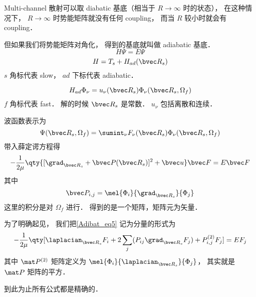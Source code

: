 
Multi-channel 散射可以取 diabatic 基底（相当于 $R\to \infty$ 时的状态）， 在这种情况下， $R\to\infty$ 时势能矩阵就没有任何 coupling， 而当 $R$ 较小时就会有 coupling．

但如果我们将势能矩阵对角化， 得到的基底就叫做 adiabatic 基底．
\begin{equation}
H \Psi = E \Psi
\end{equation}
\begin{equation}
H = T_s + H_{ad}(\bvec R_s)
\end{equation}
$s$ 角标代表 slow， $ad$ 下标代表 adiabatic．

\begin{equation}
H_{ad} \Phi_\nu = u_\nu (\bvec R_s) \Phi_\nu (\bvec R_s, \Omega_f)
\end{equation}
$f$ 角标代表 fast． 解的时候 $\bvec R_s$ 是常数． $u_\nu$ 包括离散和连续．

波函数表示为
\begin{equation}
\Psi(\bvec R_s, \Omega_f) = \sumint_\nu F_\nu (\bvec R_s) \Phi_\nu(\bvec R_s, \Omega_f)
\end{equation}
带入薛定谔方程得
\begin{equation}\label{Adibat_eq5}
-\frac{1}{2\mu} \qty{[\grad_{\bvec R_s} + \bvec P(\bvec R_s)]^2 + \bvec u} \bvec F = E \bvec F
\end{equation}
其中
\begin{equation}
\bvec P_{i,j} = \mel{\Phi_i}{\grad_{\bvec R_s}}{\Phi_j}
\end{equation}
这里的积分是对 $\Omega_f$ 进行． 得到的是一个矩阵，矩阵元为矢量．

为了明确起见， 我们把\autoref{Adibat_eq5} 记为分量的形式为
\begin{equation}
-\frac{1}{2\mu} \qty[\laplacian_{\bvec R_s} F_i + 2\sum_j ( P_{ij} \grad_{\bvec R_s} F_j) + P_{i,j}^{(2)} F_j] = E F_j
\end{equation}
其中 $\mat P^{(2)}$ 矩阵定义为 $\mel{\Phi_i}{\laplacian_{\bvec R_s}}{\Phi_j}$， 其实就是 $\mat P$ 矩阵的平方．

到此为止所有公式都是精确的．
